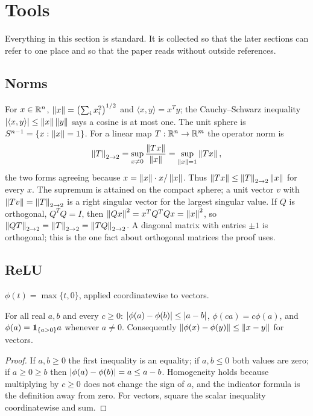 \section{Tools}
\label{sec:tools}

Everything in this section is standard. It is collected so that the later sections can refer to one place and so that the paper reads without outside references.

\subsection{Norms}

For $x\in\mathbb{R}^n$, $\left\lVert x\right\rVert=\bigl(\sum_i x_i^2\bigr)^{1/2}$ and $\langle x,y\rangle=x^Ty$; the Cauchy--Schwarz inequality $\left\lvert \langle x,y\rangle\right\rvert\le\left\lVert x\right\rVert\left\lVert y\right\rVert$ says a cosine is at most one. The unit sphere is $S^{n-1}=\{x:\left\lVert x\right\rVert=1\}$. For a linear map $T:\mathbb{R}^n\to\mathbb{R}^m$ the operator norm is
\[
\left\lVert T\right\rVert_{2\to 2}=\sup_{x\ne 0}\frac{\left\lVert Tx\right\rVert}{\left\lVert x\right\rVert}=\sup_{\left\lVert x\right\rVert=1}\left\lVert Tx\right\rVert,
\]
the two forms agreeing because $x=\left\lVert x\right\rVert\cdot x/\left\lVert x\right\rVert$. Thus $\left\lVert Tx\right\rVert\le\left\lVert T\right\rVert_{2\to 2}\left\lVert x\right\rVert$ for every $x$. The supremum is attained on the compact sphere; a unit vector $v$ with $\left\lVert Tv\right\rVert=\left\lVert T\right\rVert_{2\to 2}$ is a right singular vector for the largest singular value. If $Q$ is orthogonal, $Q^TQ=I$, then $\left\lVert Qx\right\rVert^2=x^TQ^TQx=\left\lVert x\right\rVert^2$, so $\left\lVert QT\right\rVert_{2\to 2}=\left\lVert T\right\rVert_{2\to 2}=\left\lVert TQ\right\rVert_{2\to 2}$. A diagonal matrix with entries $\pm1$ is orthogonal; this is the one fact about orthogonal matrices the proof uses.

\subsection{ReLU}

$\phi(t)=\max\{t,0\}$, applied coordinatewise to vectors.

\begin{lemma}\label{lem:relu}
For all real $a,b$ and every $c\ge 0$: $\left\lvert \phi(a)-\phi(b)\right\rvert\le\left\lvert a-b\right\rvert$, $\phi(ca)=c\phi(a)$, and $\phi(a)=\mathbf{1}_{\{a>0\}}a$ whenever $a\ne 0$. Consequently $\left\lVert \phi(x)-\phi(y)\right\rVert\le\left\lVert x-y\right\rVert$ for vectors.
\end{lemma}

\begin{proof}
If $a,b\ge 0$ the first inequality is an equality; if $a,b\le 0$ both values are zero; if $a\ge 0\ge b$ then $\left\lvert \phi(a)-\phi(b)\right\rvert=a\le a-b$. Homogeneity holds because multiplying by $c\ge 0$ does not change the sign of $a$, and the indicator formula is the definition away from zero. For vectors, square the scalar inequality coordinatewise and sum.
\end{proof}

